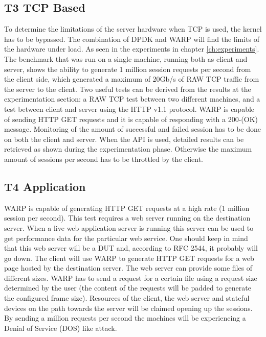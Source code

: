 \subsection{T3 TCP Based}
To determine the limitations of the server hardware when TCP is used, the kernel has to be bypassed. The combination of DPDK and WARP will find the limits of the hardware under load. As seen in the experiments in chapter \ref{ch:experiments}. The benchmark that was run on a single machine, running both as client and server, shows the ability to generate 1 million session requests per second from the client side, which generated a maximum of 20Gb/s of RAW TCP traffic from the server to the client. 
Two useful tests can be derived from the results at the experimentation section: a RAW TCP test between two different machines, and a test between client and server using the HTTP v1.1 protocol. 
WARP is capable of sending  HTTP GET requests and it is capable of responding with a 200-(OK) message. 
Monitoring of the amount of successful and failed session has to be done on both the client and server. When the API is used, detailed results can be retrieved as shown during the experimentation phase. Otherwise the maximum amount of sessions per second has to be throttled by the client.    

\subsection{T4 Application}
WARP is capable of generating HTTP GET requests at a high rate (1 million session per second). This test requires a web server running on the destination server. 
When a live web application server is running this server can be used to get performance data for the particular web service. 
One should keep in mind that this web server will be a DUT and, according to RFC 2544, it probably will go down.   
The client will use WARP to generate HTTP GET requests for a web page hosted by the destination server. The web server can provide some files of different sizes. WARP has to send a request for a certain file using a request size determined by the user (the content of the requests will be padded to generate the configured frame size).  Resources of the client, the web server and stateful devices on the path towards the server will be claimed opening up the sessions. By sending a million requests per second the machines will be experiencing a Denial of Service (DOS) like attack.

